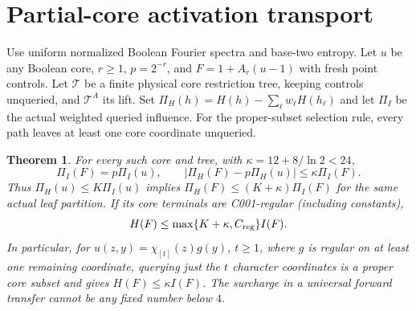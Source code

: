 \documentclass{article}
\newtheorem{theorem}{Theorem}
\begin{document}
\section*{Partial-core activation transport}
Use uniform normalized Boolean Fourier spectra and base-two entropy. Let $u$ be any Boolean core, $r\ge1$, $p=2^{-r}$, and $F=1+A_r(u-1)$ with fresh point controls. Let $\mathcal T$ be a finite physical core restriction tree, keeping controls unqueried, and $\mathcal T^A$ its lift. Set $\Pi_H(h)=H(h)-\sum_\ell w_\ell H(h_\ell)$ and let $\Pi_I$ be the actual weighted queried influence. For the proper-subset selection rule, every path leaves at least one core coordinate unqueried.
\begin{theorem}
For every such core and tree, with $\kappa=12+8/\ln2<24$,
\[\Pi_I(F)=p\Pi_I(u),\qquad |\Pi_H(F)-p\Pi_H(u)|\le\kappa\Pi_I(F).\]
Thus $\Pi_H(u)\le K\Pi_I(u)$ implies $\Pi_H(F)\le(K+\kappa)\Pi_I(F)$ for the same actual leaf partition. If its core terminals are C001-regular (including constants),
\[H(F)\le\max\{K+\kappa,C_{\rm reg}\}I(F).\]
In particular, for $u(z,y)=\chi_{[t]}(z)g(y)$, $t\ge1$, where $g$ is regular on at least one remaining coordinate, querying just the $t$ character coordinates is a proper core subset and gives $H(F)\le\kappa I(F)$. The surcharge in a universal forward transfer cannot be any fixed number below $4$.
\end{theorem}
\end{document}
